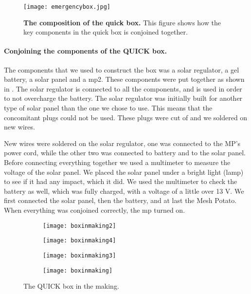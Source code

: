 \begin{figure}[t]
  \centering
      \texttt{[image: emergencybox.jpg]}
  \caption [The composition of the \gls{quick} box]{\textbf{The composition of the \gls{quick} box.} This figure shows how the key components in the \gls{quick} box is conjoined together.}
  \label{fig:emergencybox}
\end{figure}

\paragraph{Conjoining the components of the QUICK box.}
The components that we used to construct the box was a solar regulator, a gel battery, a solar panel and a \gls{mp2}. These components were put together as shown in . The solar regulator is connected to all the components, and is used in order to not overcharge the battery. The solar regulator was initially built for another type of solar panel than the one we chose to use. This means that the concomitant plugs could not be used. These plugs were cut of and we soldered on new wires.  

New wires were soldered on the solar regulator, one was connected to the MP's power cord, while the other two was connected to battery and to the solar panel. Before connecting everything together we used a multimeter to measure the voltage of the solar panel. We placed the solar panel under a bright light (lamp) to see if it had any impact, which it did. We used the multimeter to check the battery as well, which was fully charged, with a voltage of a little over 13 V. 
We first connected the solar panel, then the battery, and at last the Mesh Potato. When everything was conjoined correctly, the \gls{mp} turned on.  

\begin{figure}
        \centering
        \begin{subfigure}[t]{0.4\textwidth}
                \texttt{[image: boxinmaking2]}
                \label{fig:boxinmaking2}
        \end{subfigure}
        \begin{subfigure}[t]{0.4\textwidth}
                \texttt{[image: boxinmaking4]}
                \label{fig:boxinmaking}
        \end{subfigure}
         \begin{subfigure}[t]{0.3\textwidth}
                \texttt{[image: boxinmaking3]} 
                \label{fig:boxinmaking3}
        \end{subfigure}
        \begin{subfigure}[t]{0.4\textwidth}
                \texttt{[image: boxinmaking]} 
                \label{fig:boxinmaking4}
        \end{subfigure}
\caption{The QUICK box in the making.} \label{fig:boxinmaking}
\end{figure}

